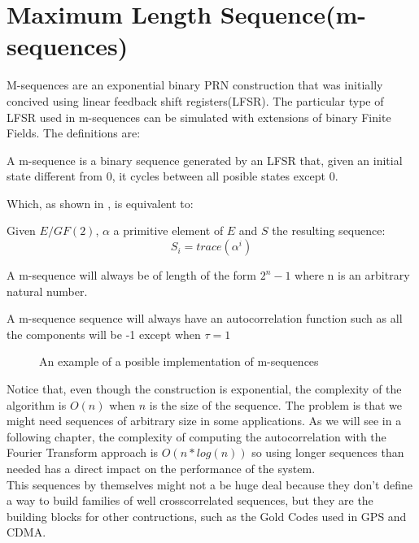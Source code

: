 \section{Maximum Length Sequence(m-sequences)}

M-sequences are an exponential binary PRN construction that was initially
concived using linear feedback shift registers(LFSR). The particular type of
LFSR used in m-sequences can be simulated with extensions of binary Finite
Fields. The definitions are:

\begin{definition}[LFSR]
  A m-sequence is a binary sequence generated by an LFSR that, given an initial
  state different from 0, it cycles between all posible states except 0.
\end{definition}

Which, as shown in \citet{golomb_ref}, is equivalent to:

\begin{definition}
  Given $E/GF(2)$, $\alpha$ a primitive element of $E$ and $S$ the resulting
  sequence:
  \begin{equation}
    S_{i} = trace(\alpha^{i})
  \end{equation}
\end{definition}

\begin{property}
  A m-sequence will always be of length of the form $2^{n}-1$ where n is an
  arbitrary natural number.
\end{property}

\begin{property}
  A m-sequence sequence will always have an autocorrelation function such as
  all the components will be -1 except when $\tau = 1$
\end{property}

\begin{figure}[ht!]
  \caption{An example of a posible implementation of m-sequences}
  \label{mls:fig:1}
\end{figure}

Notice that, even though the construction is exponential, the complexity of
the algorithm is $O(n)$ when $n$ is the size of the sequence. The problem is
that we might need sequences of arbitrary size in some applications. As we will
see in a following chapter, the complexity of computing the autocorrelation
with the Fourier Transform approach is $O(n*log(n))$ so using longer sequences
than needed has a direct impact on the performance of the system. \\

This sequences by themselves might not a be huge deal because they don't define
a way to build families of well crosscorrelated sequences, but they are the
building blocks for other contructions, such as the Gold Codes used in GPS and
CDMA.

